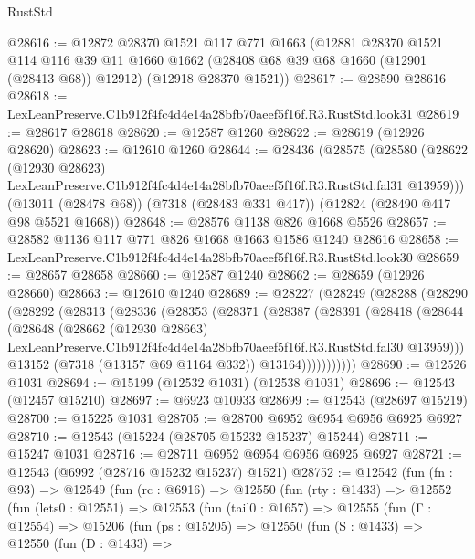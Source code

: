 \begin{lexlean}{RustStd}
\begin{coremodule}
@28616 := @12872
    @28370
    @1521
    @117
    @771
    @1663
    (@12881
      @28370
      @1521
      @114
      @116
      @39
      @11
      @1660
      @1662
      (@28408 @68 @39 @68 @1660 (@12901 (@28413 @68)) @12912)
      (@12918 @28370 @1521))
@28617 := @28590 @28616
@28618 := LexLeanPreserve.C1b912f4fc4d4e14a28bfb70aeef5f16f.R3.RustStd.look31
@28619 := @28617 @28618
@28620 := @12587 @1260
@28622 := @28619 (@12926 @28620)
@28623 := @12610 @1260
@28644 := @28436
    (@28575
      (@28580
        (@28622
          (@12930 @28623)
          LexLeanPreserve.C1b912f4fc4d4e14a28bfb70aeef5f16f.R3.RustStd.fal31
          @13959)))
    (@13011 (@28478 @68))
    (@7318 (@28483 @331 @417))
    (@12824 (@28490 @417 @98 @5521 @1668))
@28648 := @28576 @1138 @826 @1668 @5526
@28657 := @28582 @1136 @117 @771 @826 @1668 @1663 @1586 @1240 @28616
@28658 := LexLeanPreserve.C1b912f4fc4d4e14a28bfb70aeef5f16f.R3.RustStd.look30
@28659 := @28657 @28658
@28660 := @12587 @1240
@28662 := @28659 (@12926 @28660)
@28663 := @12610 @1240
@28689 := @28227
    (@28249
      (@28288
        (@28290
          (@28292
            (@28313
              (@28336
                (@28353
                  (@28371
                    (@28387
                      (@28391
                        (@28418
                          (@28644
                            (@28648
                              (@28662
                                (@12930 @28663)
                                LexLeanPreserve.C1b912f4fc4d4e14a28bfb70aeef5f16f.R3.RustStd.fal30
                                @13959)))
                          @13152
                          (@7318 (@13157 @69 @1164 @332))
                          @13164)))))))))))
@28690 := @12526 @1031
@28694 := @15199 (@12532 @1031) (@12538 @1031)
@28696 := @12543 (@12457 @15210)
@28697 := @6923 @10933
@28699 := @12543 (@28697 @15219)
@28700 := @15225 @1031
@28705 := @28700 @6952 @6954 @6956 @6925 @6927
@28710 := @12543 (@15224 (@28705 @15232 @15237) @15244)
@28711 := @15247 @1031
@28716 := @28711 @6952 @6954 @6956 @6925 @6927
@28721 := @12543 (@6992 (@28716 @15232 @15237) @1521)
@28752 := @12542
    (fun (fn : @93) =>
    @12549
      (fun (rc : @6916) =>
      @12550
        (fun (rty : @1433) =>
        @12552
          (fun (lets0 : @12551) =>
          @12553
            (fun (tail0 : @1657) =>
            @12555
              (fun (Γ : @12554) =>
              @15206
                (fun (ps : @15205) =>
                @12550
                  (fun (S : @1433) =>
                  @12550
                    (fun (D : @1433) =>

\end{coremodule}
\end{lexlean}
